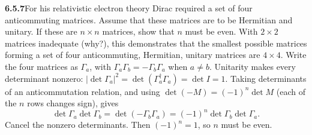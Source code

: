 \par\bigskip
\noindent\textbf{6.5.7}\quad For his relativistic electron theory Dirac
required a set of four anticommuting matrices. Assume that these matrices are
to be Hermitian and unitary. If these are $n\times n$ matrices, show that $n$
must be even. With $2\times2$ matrices inadequate (why?), this demonstrates
that the smallest possible matrices forming a set of four anticommuting,
Hermitian, unitary matrices are $4\times4$.
\solution
Write the four matrices as $\Gamma_a$, with
$\Gamma_a\Gamma_b=-\Gamma_b\Gamma_a$ when $a\ne b$.
Unitarity makes every determinant nonzero:
$|\det\Gamma_a|^2=\det(\Gamma_a^\dagger\Gamma_a)=\det I=1$.
Taking determinants of an anticommutation relation, and using
$\det(-M)=(-1)^n\det M$ (each of the $n$ rows changes sign), gives
\[
\det\Gamma_a\det\Gamma_b
=\det(-\Gamma_b\Gamma_a)
=(-1)^n\det\Gamma_b\det\Gamma_a.
\]
Cancel the nonzero determinants. Then $(-1)^n=1$, so $n$ must be even.

